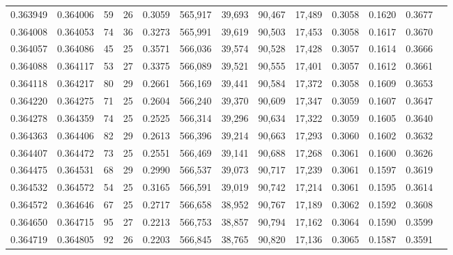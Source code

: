 \begin{tabular}{rrrrrrrrrrrrr}
0.363949 & 0.364006 &    59 &  26 &                                     0.3059 & 565,917 &  39,693 &  90,467 &  17,489 & 0.3058 & 0.1620 & 0.3677 \\
0.364008 & 0.364053 &    74 &  36 &                                     0.3273 & 565,991 &  39,619 &  90,503 &  17,453 & 0.3058 & 0.1617 & 0.3670 \\
0.364057 & 0.364086 &    45 &  25 &                                     0.3571 & 566,036 &  39,574 &  90,528 &  17,428 & 0.3057 & 0.1614 & 0.3666 \\
0.364088 & 0.364117 &    53 &  27 &                                     0.3375 & 566,089 &  39,521 &  90,555 &  17,401 & 0.3057 & 0.1612 & 0.3661 \\
0.364118 & 0.364217 &    80 &  29 &                                     0.2661 & 566,169 &  39,441 &  90,584 &  17,372 & 0.3058 & 0.1609 & 0.3653 \\
0.364220 & 0.364275 &    71 &  25 &                                     0.2604 & 566,240 &  39,370 &  90,609 &  17,347 & 0.3059 & 0.1607 & 0.3647 \\
0.364278 & 0.364359 &    74 &  25 &                                     0.2525 & 566,314 &  39,296 &  90,634 &  17,322 & 0.3059 & 0.1605 & 0.3640 \\
0.364363 & 0.364406 &    82 &  29 &                                     0.2613 & 566,396 &  39,214 &  90,663 &  17,293 & 0.3060 & 0.1602 & 0.3632 \\
0.364407 & 0.364472 &    73 &  25 &                                     0.2551 & 566,469 &  39,141 &  90,688 &  17,268 & 0.3061 & 0.1600 & 0.3626 \\
0.364475 & 0.364531 &    68 &  29 &                                     0.2990 & 566,537 &  39,073 &  90,717 &  17,239 & 0.3061 & 0.1597 & 0.3619 \\
0.364532 & 0.364572 &    54 &  25 &                                     0.3165 & 566,591 &  39,019 &  90,742 &  17,214 & 0.3061 & 0.1595 & 0.3614 \\
0.364572 & 0.364646 &    67 &  25 &                                     0.2717 & 566,658 &  38,952 &  90,767 &  17,189 & 0.3062 & 0.1592 & 0.3608 \\
0.364650 & 0.364715 &    95 &  27 &                                     0.2213 & 566,753 &  38,857 &  90,794 &  17,162 & 0.3064 & 0.1590 & 0.3599 \\
0.364719 & 0.364805 &    92 &  26 &                                     0.2203 & 566,845 &  38,765 &  90,820 &  17,136 & 0.3065 & 0.1587 & 0.3591 \\

\end{tabular}
